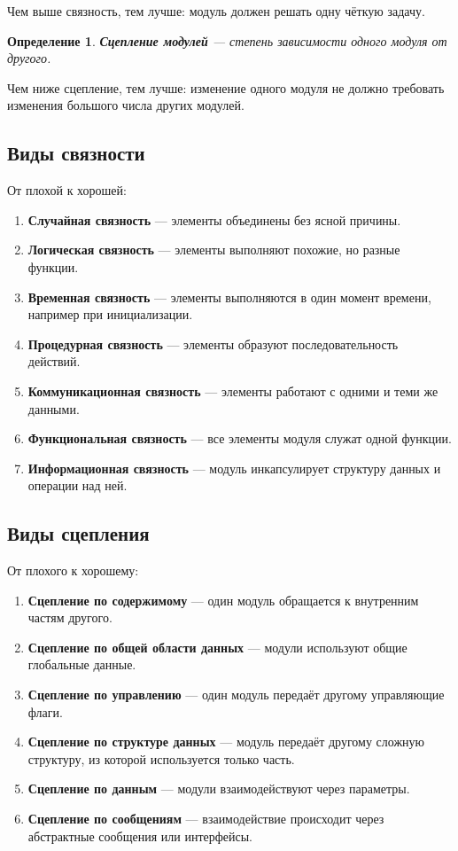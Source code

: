 \documentclass[12pt,a4paper]{article}
\newtheorem{definition}{Определение}
\begin{document}
Чем выше связность, тем лучше: модуль должен решать одну чёткую задачу.

\begin{definition}
\textbf{Сцепление модулей} --- степень зависимости одного модуля от другого.
\end{definition}

Чем ниже сцепление, тем лучше: изменение одного модуля не должно требовать изменения большого числа других модулей.

\subsection{Виды связности}

От плохой к хорошей:
\begin{enumerate}
  \item \textbf{Случайная связность} --- элементы объединены без ясной причины.
  \item \textbf{Логическая связность} --- элементы выполняют похожие, но разные функции.
  \item \textbf{Временная связность} --- элементы выполняются в один момент времени, например при инициализации.
  \item \textbf{Процедурная связность} --- элементы образуют последовательность действий.
  \item \textbf{Коммуникационная связность} --- элементы работают с одними и теми же данными.
  \item \textbf{Функциональная связность} --- все элементы модуля служат одной функции.
  \item \textbf{Информационная связность} --- модуль инкапсулирует структуру данных и операции над ней.
\end{enumerate}

\subsection{Виды сцепления}

От плохого к хорошему:
\begin{enumerate}
  \item \textbf{Сцепление по содержимому} --- один модуль обращается к внутренним частям другого.
  \item \textbf{Сцепление по общей области данных} --- модули используют общие глобальные данные.
  \item \textbf{Сцепление по управлению} --- один модуль передаёт другому управляющие флаги.
  \item \textbf{Сцепление по структуре данных} --- модуль передаёт другому сложную структуру, из которой используется только часть.
  \item \textbf{Сцепление по данным} --- модули взаимодействуют через параметры.
  \item \textbf{Сцепление по сообщениям} --- взаимодействие происходит через абстрактные сообщения или интерфейсы.
\end{enumerate}
\end{document}
